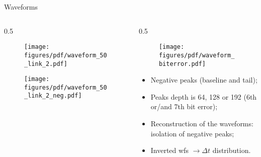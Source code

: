 \documentclass{beamer}[10pt]
\begin{document}
\begin{frame}{Waveforms}
\vspace{-4mm}
\begin{columns}
\begin{column}{0.5\framewidth}
\begin{figure}[H]
   \centering
   \texttt{[image: figures/pdf/waveform\_50\_link\_2.pdf]}
   \label{fig:wfgkghl}
 \end{figure}
\vspace{-9mm}
\begin{figure}[H]
   \centering
   \texttt{[image: figures/pdf/waveform\_50\_link\_2\_neg.pdf]}
   \label{fig:wfgkgnvjkhl}
 \end{figure}
\end{column}
\begin{column}{0.5\framewidth}
\vspace{-2mm}
\begin{figure}[H]
   \centering
   \texttt{[image: figures/pdf/waveform\_biterror.pdf]}
   \label{fig:wffytl}
 \end{figure}
\vspace{-5mm}
\begin{itemize}
\item Negative peaks (baseline and tail);
\item Peaks depth is 64, 128 or 192 (6th or/and 7th bit error);
\item Reconstruction of the waveforms: isolation of negative peaks;
\item Inverted wfs $ \rightarrow \Delta t$ distribution.
\end{itemize}
\end{column}
\end{columns}
\end{frame}
\end{document}
